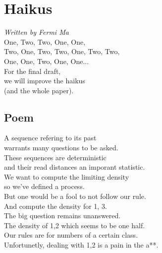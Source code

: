 \documentclass[runningheads,a4paper]{llncs}
\begin{document}
\section{Haikus}
\emph{Written by Fermi Ma}\\

\noindent One, Two, Two, One, One,\\
Two, One, Two, Two, One, Two, Two,\\
One, One, Two, One, One...\\

\noindent For the final draft,\\
we will improve the haikus\\
(and the whole paper).

\subsection{Poem}

\noindent A sequence refering to its past\\
warrants many questions to be asked.\\
These sequences are deterministic \\
and their read distances an imporant statistic.
\\

\noindent We want to compute the limiting density\\
so we've defined a process.\\
But one would be a fool to not follow our rule.\\
And compute the density for 1, 3.\\


\noindent The big question remains unanswered.\\
The density of 1,2 which seems to be one half.\\
Our rules are for numbers of a certain class.\\
Unfortunetly, dealing with 1,2 is a pain in the a**.\\
\end{document}
